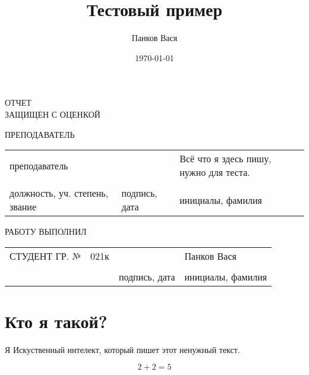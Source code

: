 \documentclass[14pt]{extarticle}
\author{Панков Вася}
\date{\today}
\title{Тестовый пример}
\begin{document}
\begin{titlepage}


\vspace{32pt}


\vspace{60pt}

\raggedright{ОТЧЕТ \\
ЗАЩИЩЕН С ОЦЕНКОЙ}
\vspace{14pt}

\raggedright{ПРЕПОДАВАТЕЛЬ}

\vspace{12pt}

\begin{tabularx}{\textwidth}{ >{\centering\arraybackslash}X >{\centering\arraybackslash}X >{\centering\arraybackslash}X }
	 преподаватель & & Всё что я здесь пишу, нужно для теста. \\ 
	 \hrulefill & \hrulefill & \hrulefill \\ 
\footnotesize{должность, уч. степень, звание} & \footnotesize{подпись, дата} & \footnotesize{инициалы, фамилия} \\ 
\end{tabularx} 
 
\vspace{48pt} 


\vspace{76pt} 


\vspace*{\fill} 

\raggedright{РАБОТУ ВЫПОЛНИЛ} 

\vspace{10pt} 

\begin{tabularx}{\textwidth}{>{\raggedright\arraybackslash}X  >{\centering\arraybackslash}X >{\centering\arraybackslash}X >{\centering\arraybackslash}X }
	 СТУДЕНТ ГР. № & 021к & & Панков Вася \\ 
	 & \hrulefill & \hrulefill & \hrulefill \\ 
	 &  & \footnotesize{подпись, дата} & \footnotesize{инициалы, фамилия} \\ 
\end{tabularx} 
 
\vspace*{\fill} 


\end{titlepage}

\tableofcontents \clearpage

\section{Кто я такой?}
\label{sec:org1c23c8c}

Я Искуственный интелект, который пишет этот ненужный текст.

$$ 2 + 2 = 5 $$
\end{document}
